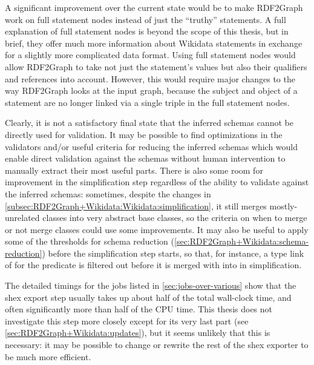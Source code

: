 A significant improvement over the current state
would be to make \gls{RDF2Graph} work on full \gls{statement} nodes instead of just the “truthy” \glspl{statement}.
A full explanation of full \gls{statement} nodes is beyond the scope of this thesis,
but in brief, they offer much more information about \gls{Wikidata} \glspl{statement}
in exchange for a slightly more complicated data format.
Using full \gls{statement} nodes would allow \gls{RDF2Graph} to take not just the \gls{statement}’s values
but also their \glspl{qualifier} and \glspl{reference} into account.
However, this would require major changes to the way \gls{RDF2Graph} looks at the input graph,
because the \gls{subject} and \gls{object} of a \gls{statement} are no longer linked via a single \gls{triple}
in the full \gls{statement} nodes.

Clearly, it is not a satisfactory final state
that the inferred \glspl{schema} cannot be directly used for validation.
It may be possible to find optimizations in the validators
and/or useful criteria for reducing the inferred \glspl{schema}
which would enable direct validation against the \glspl{schema}
without human intervention to manually extract their most useful parts.
There is also some room for improvement in the simplification step
regardless of the ability to validate against the inferred \glspl{schema}:
sometimes, despite the changes in \cref{subsec:RDF2Graph+Wikidata:Wikidata:simplification},
it still merges mostly-unrelated classes into very abstract base classes,
so the criteria on when to merge or not merge classes could use some improvements.
It may also be useful to apply some of the thresholds for schema reduction (\cref{sec:RDF2Graph+Wikidata:schema-reduction})
before the simplification step starts,
so that, for instance,
a \gls{type link} of  for the  \gls{predicate}
is filtered out before it is merged with  into  in simplification.

The detailed timings for the jobs listed in \cref{sec:jobs-over-various}
show that the \gls{shex} export step usually takes up about half of the total wall-clock time,
and often significantly more than half of the CPU time.
This thesis does not investigate this step more closely except for its very last part
(see \cref{sec:RDF2Graph+Wikidata:updates}),
but it seems unlikely that this is necessary:
it may be possible to change or rewrite the rest of the \gls{shex} exporter to be much more efficient.

